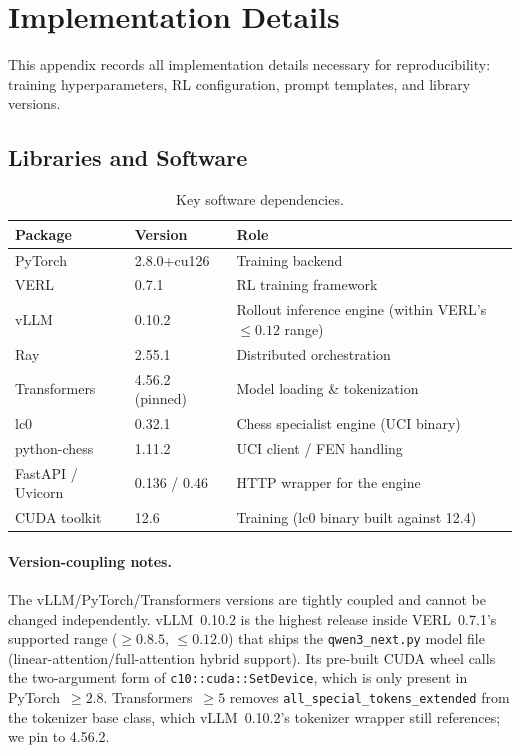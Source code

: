 \section{Implementation Details}
\label{app:details}

This appendix records all implementation details necessary for reproducibility: training hyperparameters, RL configuration, prompt templates, and library versions.

\subsection{Libraries and Software}
\label{app:details:libraries}

\begin{table}[h]
\centering
\small
\begin{tabular}{lll}
\toprule
\textbf{Package} & \textbf{Version} & \textbf{Role} \\
\midrule
PyTorch & 2.8.0+cu126 & Training backend \\
VERL & 0.7.1 & RL training framework \\
vLLM & 0.10.2 & Rollout inference engine (within VERL's $\le 0.12$ range) \\
Ray & 2.55.1 & Distributed orchestration \\
Transformers & 4.56.2 (pinned) & Model loading \& tokenization \\
lc0 & 0.32.1 & Chess specialist engine (UCI binary) \\
python-chess & 1.11.2 & UCI client / FEN handling \\
FastAPI / Uvicorn & 0.136 / 0.46 & HTTP wrapper for the engine \\
CUDA toolkit & 12.6 & Training (lc0 binary built against 12.4) \\
\bottomrule
\end{tabular}
\caption{Key software dependencies.}
\label{tab:libraries}
\end{table}

\paragraph{Version-coupling notes.}
The vLLM/PyTorch/Transformers versions are tightly coupled and cannot be
changed independently. vLLM~0.10.2 is the highest release inside VERL~0.7.1's
supported range ($\geq 0.8.5$, $\leq 0.12.0$) that ships the
\texttt{qwen3\_next.py} model file (linear-attention/full-attention hybrid
support). Its pre-built CUDA wheel calls the two-argument form of
\texttt{c10::cuda::SetDevice}, which is only present in PyTorch~$\geq 2.8$.
Transformers~$\geq 5$ removes \texttt{all\_special\_tokens\_extended} from
the tokenizer base class, which vLLM~0.10.2's tokenizer wrapper still
references; we pin to 4.56.2.

